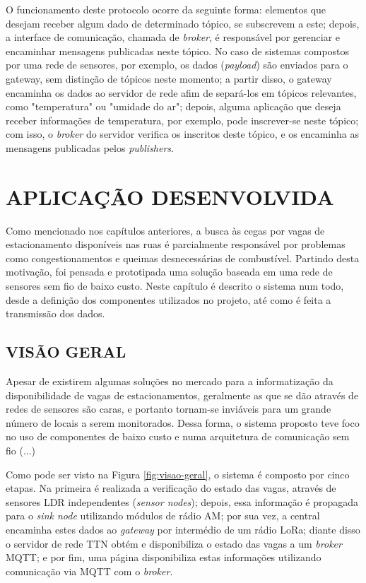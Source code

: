 \documentclass[oneside,openright,12pt]{ufsm_2015} %
\begin{document}
O funcionamento deste protocolo ocorre da seguinte forma: elementos que desejam receber algum dado de determinado tópico, se subscrevem a este; depois, a interface de comunicação, chamada de \textit{broker}, é responsável por gerenciar e encaminhar mensagens publicadas neste tópico. No caso de sistemas compostos por uma rede de sensores, por exemplo, os dados (\textit{payload}) são enviados para o gateway, sem distinção de tópicos neste momento; a partir disso, o gateway encaminha os dados ao servidor de rede afim de separá-los em tópicos relevantes, como "temperatura" ou "umidade do ar"; depois, alguma aplicação que deseja receber informações de temperatura, por exemplo, pode inscrever-se neste tópico; com isso, o \textit{broker} do servidor verifica os inscritos deste tópico, e os encaminha as mensagens publicadas pelos \textit{publishers}. 




\chapter{APLICAÇÃO DESENVOLVIDA}
Como mencionado nos capítulos anteriores, a busca às cegas por vagas de estacionamento disponíveis nas ruas é parcialmente responsável por problemas como congestionamentos e queimas desnecessárias de combustível. Partindo desta motivação, foi pensada e prototipada uma solução baseada em uma rede de sensores sem fio de baixo custo. 
Neste capítulo é descrito o sistema num todo, desde a definição dos componentes utilizados no projeto, até como é feita a transmissão dos dados.
    
    \section{VISÃO GERAL}
    Apesar de existirem algumas soluções no mercado para a informatização da disponibilidade de vagas de estacionamentos, geralmente as que se dão através de redes de sensores são caras, e portanto tornam-se inviáveis para um grande número de locais a serem monitorados. Dessa forma, o sistema proposto teve foco no uso de componentes de baixo custo e numa arquitetura de comunicação sem fio (...)
    
    Como pode ser visto na Figura \ref{fig:visao-geral}, o sistema é composto por cinco etapas. Na primeira é realizada a verificação do estado das vagas, através de sensores LDR independentes (\textit{sensor nodes}); depois, essa informação é propagada para o \textit{sink node} utilizando módulos de rádio AM; por sua vez, a central encaminha estes dados ao \textit{gateway} por intermédio de um rádio LoRa; diante disso o servidor de rede TTN obtém e disponibiliza o estado das vagas a um \textit{broker} MQTT; e por fim, uma página disponibiliza estas informações utilizando comunicação via MQTT com o \textit{broker}.
    
\end{document}
